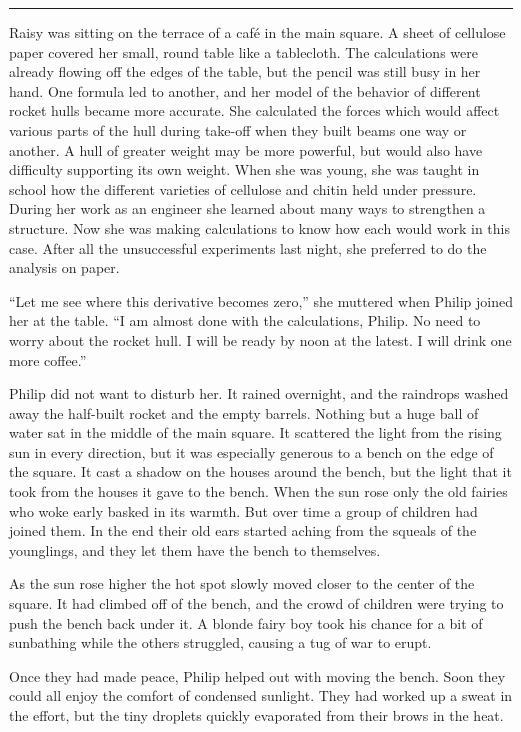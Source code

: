 \documentclass[10pt, draft]{memoir}
\renewcommand{\pfbreakdisplay}{\bigskip \ding{166} \bigskip}
\newcommand{\secbreak}{\fancybreak{\pfbreakdisplay}}
\begin{document}
\secbreak

Raisy was sitting on the terrace of a café in the main square. A sheet of
cellulose paper covered her small, round table like a tablecloth. The
calculations were already flowing off the edges of the table, but the pencil
was still busy in her hand. One formula led to another, and her model of the
behavior of different rocket hulls became more accurate. She calculated the
forces which would affect various parts of the hull during take-off when they
built beams one way or another. A hull of greater weight may be more powerful,
but would also have difficulty supporting its own weight. When she was young,
she was taught in school how the different varieties of cellulose and chitin
held under pressure. During her work as an engineer she learned about many ways
to strengthen a structure. Now she was making calculations to know how each
would work in this case. After all the unsuccessful experiments last night, she
preferred to do the analysis on paper.

``Let me see where this derivative becomes zero,'' she muttered when Philip
joined her at the table. ``I am almost done with the calculations, Philip. No
need to worry about the rocket hull. I will be ready by noon at the latest. I
will drink one more coffee.''

Philip did not want to disturb her. It rained overnight, and the raindrops
washed away the half-built rocket and the empty barrels. Nothing but a huge
ball of water sat in the middle of the main square. It scattered the light from
the rising sun in every direction, but it was especially generous to a bench on
the edge of the square. It cast a shadow on the houses around the bench, but
the light that it took from the houses it gave to the bench. When the sun rose
only the old fairies who woke early basked in its warmth. But over time a group
of children had joined them. In the end their old ears started aching from the
squeals of the younglings, and they let them have the bench to themselves.

As the sun rose higher the hot spot slowly moved closer to the center of the
square. It had climbed off of the bench, and the crowd of children were trying
to push the bench back under it. A blonde fairy boy took his chance for a bit
of sunbathing while the others struggled, causing a tug of war to erupt.

Once they had made peace, Philip helped out with moving the bench. Soon they
could all enjoy the comfort of condensed sunlight. They had worked up a sweat
in the effort, but the tiny droplets quickly evaporated from their brows in the
heat.
\end{document}
